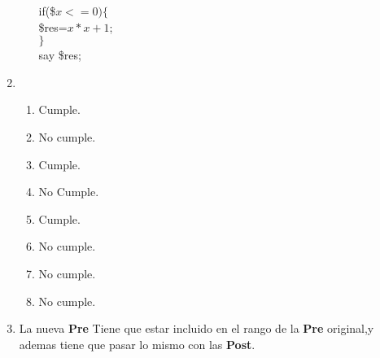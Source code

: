 \documentclass[a4paper]{article}
\begin{document}
\begin{enumerate}[label=\alph*)]
\begin{enumerate}[label=\arabic*)]
{				\hspace*{10mm}if(\$$x<=0)\{$\\
				\hspace*{13mm} \$res=$x*x+1$;\\
				\hspace*{10mm}$\}$\\
				\hspace*{10mm}say \$res;
				}
		\end{enumerate}
		\item
			\begin{enumerate}[label=\alph*)]
				\item Cumple.
				\item No cumple.
				\item Cumple.
				\item No Cumple.
				\item Cumple.
				\item No cumple.
				\item No cumple.
				\item No cumple.
			\end{enumerate}
		\item La nueva \textbf{Pre} Tiene que estar incluido en el rango de la
		 		\textbf{Pre} original,y ademas tiene que pasar lo mismo con las \textbf{Post}.
		 
	\end{enumerate}
\end{document}
